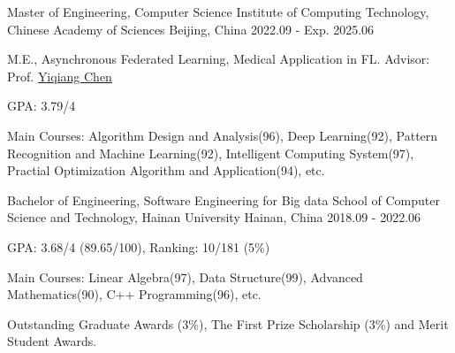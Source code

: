 

\begin{cventries}

\cventry
{Master of Engineering, Computer Science} %
{Institute of Computing Technology, Chinese Academy of Sciences} %
{Beijing, China} %
{2022.09 - Exp. 2025.06} %
{
  \begin{cvitems} %
    \item {M.E., Asynchronous Federated Learning, Medical Application in FL. Advisor: Prof. \href{https://www.ict.cas.cn/sourcedb_ict_cas/cn/jssrck/200909/t20090917_2496596.html}{Yiqiang Chen}}
    \item {GPA: 3.79/4}
    \item {Main Courses: Algorithm Design and Analysis(96), Deep Learning(92), Pattern Recognition and Machine Learning(92), Intelligent Computing System(97), Practial Optimization Algorithm and Application(94), etc.}
  \end{cvitems}
}

\cventry
{Bachelor of Engineering, Software Engineering for Big data} %
{School of Computer Science and Technology, Hainan University} %
{Hainan, China} %
{2018.09 - 2022.06} %
{
  \begin{cvitems} %
    \item {GPA: 3.68/4 (89.65/100), Ranking: 10/181 (5\%)} %
    \item {Main Courses: Linear Algebra(97), Data Structure(99), Advanced Mathematics(90), C++ Programming(96), etc.}
    \item {Outstanding Graduate Awards (3\%), The First Prize Scholarship (3\%) and Merit Student Awards.}
  \end{cvitems}
}

\end{cventries}
